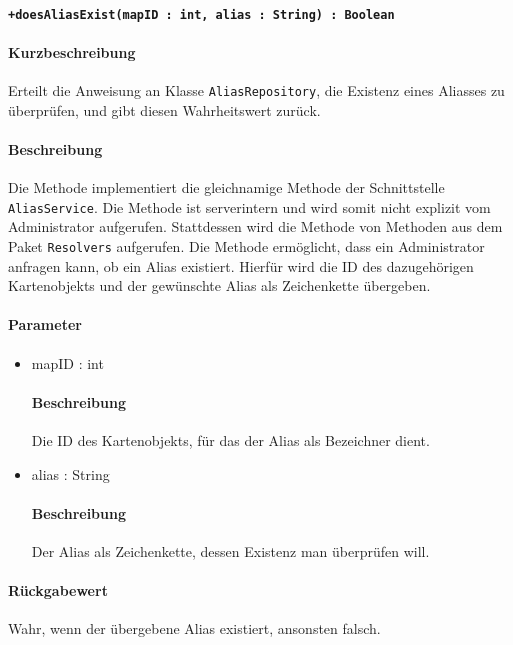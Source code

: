 \paragraph*{\texttt{+doesAliasExist(mapID : int, alias : String) : Boolean}}%
\paragraph*{Kurzbeschreibung}
Erteilt die Anweisung an Klasse \texttt{AliasRepository}, die Existenz eines Aliasses zu überprüfen, und gibt diesen Wahrheitswert zurück.
\paragraph*{Beschreibung}
Die Methode implementiert die gleichnamige Methode der Schnittstelle \texttt{AliasService}.
Die Methode ist serverintern und wird somit nicht explizit vom Administrator aufgerufen.
Stattdessen wird die Methode von Methoden aus dem Paket \texttt{Resolvers} aufgerufen.
Die Methode ermöglicht, dass ein Administrator anfragen kann, ob ein Alias existiert.
Hierfür wird die ID des dazugehörigen Kartenobjekts und der gewünschte Alias als Zeichenkette übergeben.
\paragraph*{Parameter}
\begin{itemize}
    \item mapID : int
    		\paragraph*{Beschreibung}
    		Die ID des Kartenobjekts, für das der Alias als Bezeichner dient.
    	\item alias : String
    		\paragraph*{Beschreibung}
    		Der Alias als Zeichenkette, dessen Existenz man überprüfen will.
\end{itemize}
\paragraph*{Rückgabewert}
Wahr, wenn der übergebene Alias existiert, ansonsten falsch.
